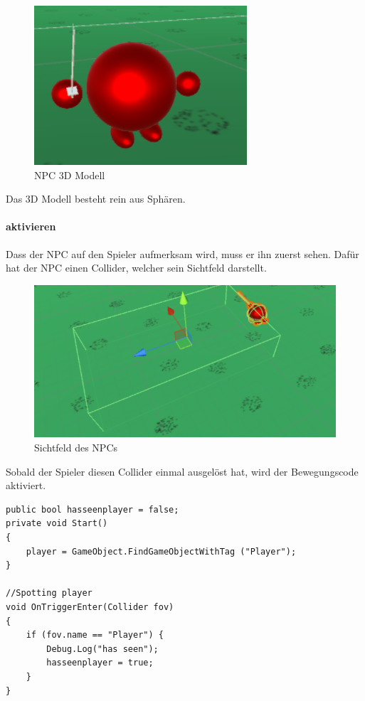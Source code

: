 \begin{figure}[H]
\includegraphics[scale=1]{screenshots/npc.png}
\caption{NPC 3D Modell}
\end{figure}
Das 3D Modell besteht rein aus Sphären.

\paragraph{aktivieren}
Dass der NPC auf den Spieler aufmerksam wird, muss er ihn zuerst sehen.
Dafür hat der NPC einen Collider, welcher sein Sichtfeld darstellt.
\begin{figure}[H]
\includegraphics[scale=1]{screenshots/fov.png}
\caption{Sichtfeld des NPCs}
\end{figure}
Sobald der Spieler diesen Collider einmal ausgelöst hat, wird der Bewegungscode aktiviert.
\begin{lstlisting}
public bool hasseenplayer = false;
private void Start()
{
	player = GameObject.FindGameObjectWithTag ("Player");
}
	
//Spotting player
void OnTriggerEnter(Collider fov)
{	
	if (fov.name == "Player") {
		Debug.Log("has seen");
		hasseenplayer = true;
	}
}
\end{lstlisting}

